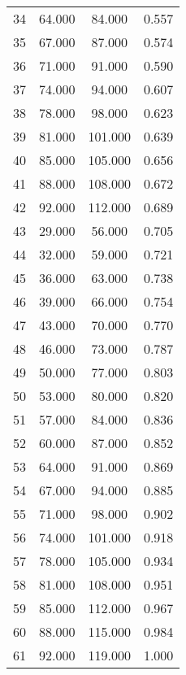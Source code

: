 \begin{tabular}{cccc}
  34 & 64.000 & 84.000 & 0.557 \\ 
  35 & 67.000 & 87.000 & 0.574 \\ 
  36 & 71.000 & 91.000 & 0.590 \\ 
  37 & 74.000 & 94.000 & 0.607 \\ 
  38 & 78.000 & 98.000 & 0.623 \\ 
  39 & 81.000 & 101.000 & 0.639 \\ 
  40 & 85.000 & 105.000 & 0.656 \\ 
  41 & 88.000 & 108.000 & 0.672 \\ 
  42 & 92.000 & 112.000 & 0.689 \\ 
  43 & 29.000 & 56.000 & 0.705 \\ 
  44 & 32.000 & 59.000 & 0.721 \\ 
  45 & 36.000 & 63.000 & 0.738 \\ 
  46 & 39.000 & 66.000 & 0.754 \\ 
  47 & 43.000 & 70.000 & 0.770 \\ 
  48 & 46.000 & 73.000 & 0.787 \\ 
  49 & 50.000 & 77.000 & 0.803 \\ 
  50 & 53.000 & 80.000 & 0.820 \\ 
  51 & 57.000 & 84.000 & 0.836 \\ 
  52 & 60.000 & 87.000 & 0.852 \\ 
  53 & 64.000 & 91.000 & 0.869 \\ 
  54 & 67.000 & 94.000 & 0.885 \\ 
  55 & 71.000 & 98.000 & 0.902 \\ 
  56 & 74.000 & 101.000 & 0.918 \\ 
  57 & 78.000 & 105.000 & 0.934 \\ 
  58 & 81.000 & 108.000 & 0.951 \\ 
  59 & 85.000 & 112.000 & 0.967 \\ 
  60 & 88.000 & 115.000 & 0.984 \\ 
  61 & 92.000 & 119.000 & 1.000 \\ 
   \hline
\end{tabular}
